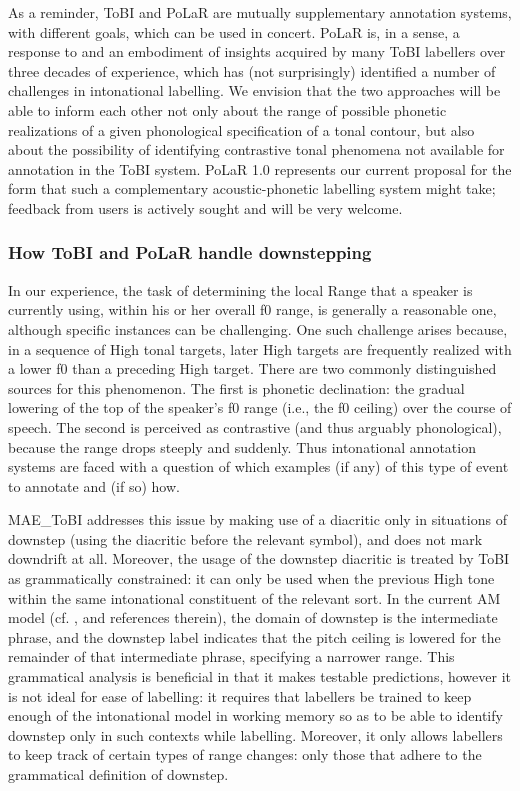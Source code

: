 \documentclass[11pt, twoside]{memoir}
\def\textlabel#1{{\relsize{-.5}\fontspec[Mapping=tex-text]{Roboto Mono}{#1}}}
\begin{document}
As a reminder, ToBI and PoLaR are mutually supplementary annotation systems, with different goals, which can be used in concert.  PoLaR is, in a sense, a response to and an embodiment of insights acquired by many ToBI labellers over three decades of experience, which has (not surprisingly) identified a number of challenges in intonational labelling. We envision that the two approaches will be able to inform each other not only about the range of possible phonetic realizations of a given phonological specification of a tonal contour, but also about the possibility of identifying contrastive tonal phenomena not available for annotation in the ToBI system. PoLaR 1.0 represents our current proposal for the form that such a complementary acoustic-phonetic labelling system might take; feedback from users is actively sought and will be very welcome.

\subsubsection{How ToBI and PoLaR handle downstepping}\label{sec:downstepping-am-models-and-tobi-annotation}
In our experience, the task of determining the local Range that a speaker is currently using, within his or her overall f0 range, is generally a reasonable one, although specific instances can be challenging. One such challenge arises because, in a sequence of High tonal targets, later High targets are frequently realized with a lower f0 than a preceding High target. There are two commonly distinguished sources for this phenomenon. The first is phonetic declination: the gradual lowering of the top of the speaker’s f0 range (i.e., the f0 ceiling) over the course of speech. The second is perceived as contrastive (and thus arguably phonological), because the range drops steeply and suddenly. Thus intonational annotation systems are faced with a question of which examples (if any) of this type of event to annotate and (if so) how.

MAE\_ToBI addresses this issue by making use of a diacritic only in situations of downstep (using the \textlabel{!} diacritic before the relevant \textlabel{H} symbol), and does not mark downdrift at all. Moreover, the usage of the downstep diacritic is treated by ToBI as grammatically constrained: it can only be used when the previous High tone within the same intonational constituent of the relevant sort. In the current AM model (cf. \citealt[17–18]{beckman-05}, and references therein), the domain of downstep is the intermediate phrase, and the downstep label indicates that the pitch ceiling is lowered for the remainder of that intermediate phrase, specifying a narrower range. This grammatical analysis is beneficial in that it makes testable predictions, however it is not ideal for ease of labelling: it requires that labellers be trained to keep enough of the intonational model in working memory so as to be able to identify downstep only in such contexts while labelling. Moreover, it only allows labellers to keep track of certain types of range changes: only those that adhere to the grammatical definition of downstep.
\end{document}
